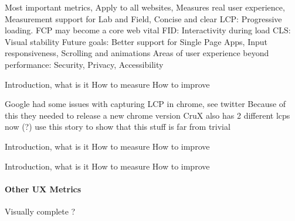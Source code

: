  Most important metrics, Apply to all websites, Measures real user experience, Measurement support for Lab and Field, Concise and clear
 LCP: Progressive loading. FCP may become a core web vital
 FID: Interactivity during load
 CLS: Visual stability
 Future goals: Better support for Single Page Apps, Input responsiveness, Scrolling and animations
 Areas of user experience beyond performance: Security, Privacy, Accessibility



 Introduction, what is it
 How to measure
 How to improve
 
 
 Google had some issues with capturing LCP in chrome, see twitter
 Because of this they needed to release a new chrome version
 CruX also has 2 different lcps now (?)
 use this story to show that this stuff is far from trivial



 Introduction, what is it
 How to measure
 How to improve



 Introduction, what is it
 How to measure
 How to improve








\paragraph{Other UX Metrics}




 Visually complete ?




